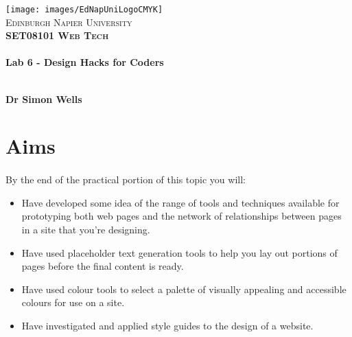 \documentclass[10pt, a4paper, twosize]{article}
\begin{document}

\begin{titlepage}
\vspace*{5cm}
\begin{center}
\texttt{[image: images/EdNapUniLogoCMYK]}~\\[1cm]

\textsc{\Large Edinburgh Napier University}\\[1.5cm]

\textsc{\LARGE \bfseries SET08101 Web Tech}\\[0.5cm]

\hrulefill \\[0.4cm]
{\huge \bfseries Lab 6 - Design Hacks for Coders \\[0.4cm] }
\hrulefill \\[1.5cm]

\begin{minipage}{0.4\textwidth}
\begin{flushleft} \large
\textbf{Dr Simon Wells} \\
\end{flushleft}
\end{minipage}

\vfill

\end{center}
\end{titlepage}




%

\section{Aims}
\paragraph{} By the end of the practical portion of this topic you will:

\begin{itemize}
\item Have developed some idea of the range of tools and techniques available for prototyping both web pages and the network of relationships between pages in a site that you're designing.
\item Have used placeholder text generation tools to help you lay out portions of pages before the final content is ready.
\item Have used colour tools to select a palette of visually appealing and accessible colours for use on a site.
\item Have investigated and applied style guides to the design of a website.
\end{itemize}
\end{document}
